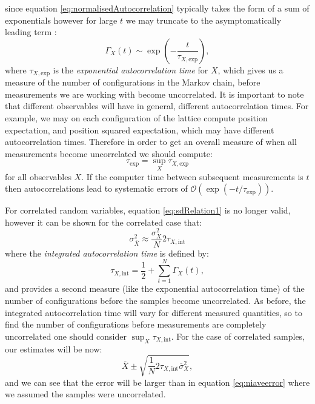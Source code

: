 \documentclass[12pt]{article}
\begin{document}
            since equation \ref{eq:normalisedAutocorrelation} typically takes the form of a sum of exponentials however for  large $t$  we may truncate to the asymptomatically leading term \cite{gattringer_lang_2013}:
            \begin{equation}
                \Gamma_{X}\left(t\right)\sim\exp\left(-\frac{t}{\tau_{X,\text{exp}}}\right),
            \end{equation}
            where $\tau_{X,\text{exp}}$ is the \textit{exponential autocorrelation time} for $X$, which gives us a measure of the number of configurations in the Markov chain, before measurements we are working with become uncorrelated. It is important to note that different observables will have in general, different autocorrelation times. For example, we may on each configuration of the lattice compute position expectation, and position squared expectation, which may have different autocorrelation times. Therefore in order to get an overall measure of when all measurements become uncorrelated we should compute:
            \begin{equation}
                \tau_{\text{exp}}=\sup_{X} \tau_{X,\text{exp}}
            \end{equation}
            for all observables $X$. If the computer time between subsequent measurements is $t$ then autocorrelations lead to systematic errors of $\mathcal{O}\left(\exp{\left( - t / \tau_{\text{exp}}\right)}\right)$\cite{gattringer_lang_2013}.

            For correlated random variables, equation \ref{eq:sdRelation1} is no longer valid, however it can be shown for the correlated case \cite{gattringer_lang_2013} that:
            \begin{equation}
                \sigma_{\overline{X}}^2 \approx \frac{\sigma_X^2}{N} 2 \tau_{X,\text{int}}
            \end{equation}
            where the \textit{integrated autocorrelation time} is defined by:
            \begin{equation}
                \label{eq:integratedAutocorrelation}
                \tau_{X,\text{int}} = \frac{1}{2} + \sum_{t=1}^{N}\Gamma_{X}\left(t\right),
            \end{equation}
            and provides  a second measure (like the exponential autocorrelation time) of the number of configurations before the samples become uncorrelated. As before, the integrated autocorrelation time will vary for different measured quantities, so to find the number of configurations before measurements are completely uncorrelated one should consider $\sup_X{\tau_{X,\text{int}}}$. 
            For the case of correlated samples, our estimates will be now:
            \begin{equation}
                \overline{X}\pm\sqrt{\frac{1}{N}2\tau_{X,\text{int}}\overline{\sigma}^{2}_{X}},
            \end{equation}
            and we can see that the error will be larger than in equation \ref{eq:niaveerror} where we assumed the samples were uncorrelated. 
\end{document}
